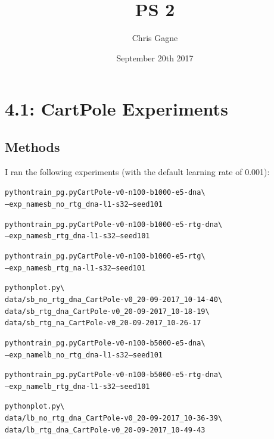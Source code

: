 \documentclass{article}\usepackage[]{graphicx}\usepackage[]{color}
\makeatletter
\newenvironment{kframe}{%
 \def\at@end@of@kframe{}%
 \ifinner\ifhmode%
  \def\at@end@of@kframe{\end{minipage}}%
  \begin{minipage}{\columnwidth}%
 \fi\fi%
 \def\FrameCommand##1{\hskip\@totalleftmargin \hskip-\fboxsep
 \colorbox{shadecolor}{##1}\hskip-\fboxsep
     \hskip-\linewidth \hskip-\@totalleftmargin \hskip\columnwidth}%
 \MakeFramed {\advance\hsize-\width
   \@totalleftmargin\z@ \linewidth\hsize
   \@setminipage}}%
 {\par\unskip\endMakeFramed%
 \at@end@of@kframe}
\newenvironment{knitrout}{}{} %
\makeatother
\begin{document}
\title{PS 2}
\author{Chris Gagne}
\date{September 20th 2017}

\maketitle



\section*{4.1: CartPole Experiments}

\subsection*{Methods}

I ran the following experiments (with the default learning rate of 0.001): 

\begin{knitrout}
\color{fgcolor}\begin{kframe}
\begin{alltt}
python train_pg.py CartPole-v0 -n 100 -b 1000 -e 5 -dna \textbackslash{}
--exp_name sb_no_rtg_dna -l 1 -s 32 --seed 101

python train_pg.py CartPole-v0 -n 100 -b 1000 -e 5 -rtg -dna \textbackslash{} 
--exp_name sb_rtg_dna -l 1 -s 32 --seed 101

python train_pg.py CartPole-v0 -n 100 -b 1000 -e 5 -rtg \textbackslash{}
--exp_name sb_rtg_na -l 1 -s 32 --seed 101

python plot.py \textbackslash{}
data/sb_no_rtg_dna_CartPole-v0_20-09-2017_10-14-40 \textbackslash{}
data/sb_rtg_dna_CartPole-v0_20-09-2017_10-18-19 \textbackslash{}
data/sb_rtg_na_CartPole-v0_20-09-2017_10-26-17

python train_pg.py CartPole-v0 -n 100 -b 5000 -e 5 -dna \textbackslash{} 
--exp_name lb_no_rtg_dna -l 1 -s 32 --seed 101

python train_pg.py CartPole-v0 -n 100 -b 5000 -e 5 -rtg -dna \textbackslash{} 
--exp_name lb_rtg_dna -l 1 -s 32 --seed 101

python plot.py \textbackslash{}
data/lb_no_rtg_dna_CartPole-v0_20-09-2017_10-36-39 \textbackslash{} 
data/lb_rtg_dna_CartPole-v0_20-09-2017_10-49-43

\end{alltt}
\end{kframe}
\end{knitrout}
\end{document}
